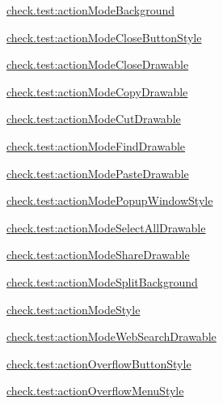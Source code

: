 {\ttfamily \hyperlink{classcheck_1_1test_1_1_r_1_1styleable_a51942708f6a610b1ec0a9c2fca839459}{check.\+test\+:action\+Mode\+Background}}

{\ttfamily \hyperlink{classcheck_1_1test_1_1_r_1_1styleable_ab30e73a8022e0a0d45477373a56e8594}{check.\+test\+:action\+Mode\+Close\+Button\+Style}}

{\ttfamily \hyperlink{classcheck_1_1test_1_1_r_1_1styleable_a4a3a5d915cea1a08a892eb22d86aa5b1}{check.\+test\+:action\+Mode\+Close\+Drawable}}

{\ttfamily \hyperlink{classcheck_1_1test_1_1_r_1_1styleable_ada960b6879c62666803bc7cbfd549a66}{check.\+test\+:action\+Mode\+Copy\+Drawable}}

{\ttfamily \hyperlink{classcheck_1_1test_1_1_r_1_1styleable_a46d9dab18374fb132f95dae524a5d910}{check.\+test\+:action\+Mode\+Cut\+Drawable}}

{\ttfamily \hyperlink{classcheck_1_1test_1_1_r_1_1styleable_af1e1008c65426da3eab077f1a462c7cb}{check.\+test\+:action\+Mode\+Find\+Drawable}}

{\ttfamily \hyperlink{classcheck_1_1test_1_1_r_1_1styleable_a537cf24632f0159627a389b005b5ad7d}{check.\+test\+:action\+Mode\+Paste\+Drawable}}

{\ttfamily \hyperlink{classcheck_1_1test_1_1_r_1_1styleable_a7430b605b613f3c152e57fba4ec0f106}{check.\+test\+:action\+Mode\+Popup\+Window\+Style}}

{\ttfamily \hyperlink{classcheck_1_1test_1_1_r_1_1styleable_a0b1f83e691b070515cd68592dacf387b}{check.\+test\+:action\+Mode\+Select\+All\+Drawable}}

{\ttfamily \hyperlink{classcheck_1_1test_1_1_r_1_1styleable_a834d173801ca8819888d149a2adb6a9e}{check.\+test\+:action\+Mode\+Share\+Drawable}}

{\ttfamily \hyperlink{classcheck_1_1test_1_1_r_1_1styleable_a8f38579426c6d3ff9440e1e2dce58bc6}{check.\+test\+:action\+Mode\+Split\+Background}}

{\ttfamily \hyperlink{classcheck_1_1test_1_1_r_1_1styleable_a21f32ef93d16b662bb12165a0ebee2be}{check.\+test\+:action\+Mode\+Style}}

{\ttfamily \hyperlink{classcheck_1_1test_1_1_r_1_1styleable_aa5a92d7f473a39b7ff9ace293dc4d2d5}{check.\+test\+:action\+Mode\+Web\+Search\+Drawable}}

{\ttfamily \hyperlink{classcheck_1_1test_1_1_r_1_1styleable_a43f29fc1f3579d42bcc1e4bbd4c853c6}{check.\+test\+:action\+Overflow\+Button\+Style}}

{\ttfamily \hyperlink{classcheck_1_1test_1_1_r_1_1styleable_a56ea39fe4c79a7e03d3181b96f1995f3}{check.\+test\+:action\+Overflow\+Menu\+Style}}

